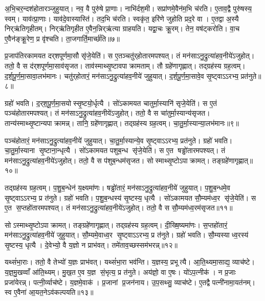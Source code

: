 अ॒भि॒चर॒न्दश॑होतारञ्जुहुयात्। नव॒ वै पुरु॑षे प्रा॒णाः। नाभि॑र्दश॒मी। सप्रा॑णमे॒वैन॑म॒भि च॑रति। ए॒ताव॒द्वै पुरु॑षस्य॒ स्वम्। याव॑त्प्रा॒णाः। याव॑दे॒वास्यास्ति॑। तद॒भि च॑रति। स्वकृ॑त॒ इरि॑णे जुहोति प्रद॒रे वा। ए॒तद्वा अ॒स्यै निर्‌ऋ॑तिगृहीतम्। निर्‌ऋ॑तिगृहीत ए॒वैन॒न्निर्‌ऋ॑त्या ग्राहयति। यद्वा॒चः क्रू॒रम्। तेन॒ वष॑ट्करोति। वा॒च ए॒वैन॑ङ्क्रू॒रेण॒ प्र वृ॑श्चति। ता॒जगार्ति॒मार्च्छ॑ति॥७॥\anuvakamend[दश॑होता॒ सृष्ट्या॑ ऋ॒च्छेद्व्याच॑प्टे रुन्ध ए॒व त॑नुते॒ निर्‌ऋ॑तिगृहीतं॒ पञ्च॑ च]

प्र॒जाप॑तिरकामयत दर्‌शपूर्णमा॒सौ सृ॑जे॒येति॑। स ए॒तञ्चतु॑र्‌होतारमपश्यत्। तं मन॑साऽनु॒द्रुत्या॑हव॒नीये॑ऽजुहोत्। ततो॒ वै स द॑र्‌शपूर्णमा॒साव॑सृजत। ताव॑स्माथ्सृ॒ष्टावपाक्रामताम्। तौ ग्रहे॑णागृह्णात्। तद्ग्रह॑स्य ग्रह॒त्वम्। द॒र्श॒पू॒र्ण॒मा॒सावा॒लभ॑मानः। चतु॑र्‌होतारं॒ मन॑साऽनु॒द्रुत्या॑हव॒नीये॑ जुहुयात्। द॒र्श॒पू॒र्ण॒मा॒सावे॒व सृ॒ष्ट्वाऽऽरभ्य॒ प्रत॑नुते॥८॥

ग्रहो॑ भवति। द॒र्‌श॒पू॒र्ण॒मा॒सयोस्सृ॒ष्टयो॒र्धृत्यै। सो॑ऽकामयत चातुर्मा॒स्यानि॑ सृजे॒येति॑। स ए॒तं पञ्च॑होतारमपश्यत्। तं मन॑साऽनु॒द्रुत्या॑हव॒नीये॑ऽजुहोत्। ततो॒ वै स चा॑तुर्मा॒स्यान्य॑सृजत। तान्य॑स्माथ्सृ॒ष्टान्यपाक्रामन्न्। तानि॒ ग्रहे॑णागृह्णात्। तद्ग्रह॑स्य ग्रह॒त्वम्। चा॒तु॒र्मा॒स्यान्या॒लभ॑मानः॥९॥

पञ्च॑होतारं॒ मन॑साऽनु॒द्रुत्या॑हव॒नीये॑ जुहुयात्। चा॒तु॒र्मा॒स्यान्ये॒व सृ॒ष्ट्वाऽऽरभ्य॒ प्रत॑नुते। ग्रहो॑ भवति। चा॒तु॒र्मा॒स्याना सृ॒ष्टाना॒न्धृत्यै। सो॑ऽकामयत पशुब॒न्ध सृ॑जे॒येति॑। स ए॒त षड्ढो॑तारमपश्यत्। तं मन॑साऽनु॒द्रुत्या॑हव॒नीये॑ऽजुहोत्। ततो॒ वै स प॑शुब॒न्धम॑सृजत। सोस्माथ्सृ॒ष्टोऽपाक्रामत्। तङ्ग्रहे॑णागृह्णात्॥१०॥

तद्ग्रह॑स्य ग्रह॒त्वम्। प॒शु॒ब॒न्धेन॑ य॒क्ष्यमा॑णः। षड्ढो॑तारं॒ मन॑साऽनु॒द्रुत्या॑हव॒नीये॑ जुहुयात्। प॒शु॒ब॒न्धमे॒व सृ॒ष्ट्वाऽऽरभ्य॒ प्र त॑नुते। ग्रहो॑ भवति। प॒शु॒ब॒न्धस्य॑ सृ॒ष्टस्य॒ धृत्यै। सो॑ऽकामयत सौ॒म्यम॑ध्व॒र सृ॑जे॒येति॑। स ए॒त स॒प्तहो॑तारमपश्यत्। तं मन॑साऽनु॒द्रुत्या॑हव॒नीये॑ऽजुहोत्। ततो॒ वै स सौ॒म्यम॑ध्व॒रम॑सृजत॥११॥

सोऽस्माथ्सृ॒ष्टोऽपाक्रामत्। तङ्ग्रहे॑णागृह्णात्। तद्ग्रह॑स्य ग्रह॒त्वम्। दी॒ख्षि॒ष्यमा॑णः। स॒प्तहो॑तारं॒ मन॑साऽनु॒द्रुत्या॑हव॒नीये॑ जुहुयात्। सौ॒म्यमे॒वाध्व॒र सृ॒ष्ट्वाऽऽरभ्य॒ प्र त॑नुते। ग्रहो॑ भवति। सौ॒म्यस्याध्व॒रस्य॑ सृ॒ष्टस्य॒ धृत्यै। दे॒वेभ्यो॒ वै य॒ज्ञो न प्राभ॑वत्। तमे॑ताव॒च्छस्सम॑भरन्न्॥१२॥

यथ्सं॑भा॒राः। ततो॒ वै तेभ्यो॑ य॒ज्ञः प्राभ॑वत्। यथ्सं॑भा॒रा भव॑न्ति। य॒ज्ञस्य॒ प्रभूत्यै। आ॒ति॒थ्यमा॒साद्य॒ व्याच॑ष्टे। य॒ज्ञ॒मु॒खव्वाँ आ॑ति॒थ्यम्। मु॒ख॒त ए॒व य॒ज्ञ सं॒भृत्य॒ प्र त॑नुते। अय॑ज्ञो॒ वा ए॒षः। यो॑ऽप॒त्नीक॑। न प्र॒जाः प्रजा॑येरन्न्। पत्नी॒र्व्याच॑ष्टे। य॒ज्ञमे॒वाक॑। प्र॒जानां प्र॒जन॑नाय। उ॒प॒सथ्सु॒ व्याच॑ष्टे। ए॒तद्वै पत्नी॑नामा॒यत॑नम्। स्व ए॒वैना॑ आ॒यत॒नेऽव॑कल्पयति॥१३॥\anuvakamend[त॒नु॒त॒ आ॒लभ॑मानोऽगृह्णादसृजताभरञ्जायेर॒न्थ्षट्च॑]

